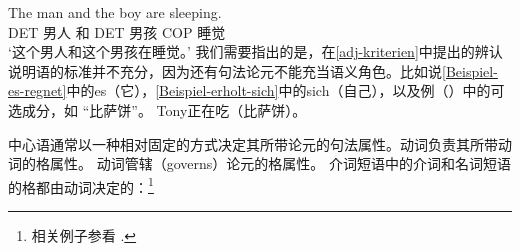 \ea
\gll The man and the boy are sleeping.\\
      DET 男人 和 DET 男孩  COP 睡觉\\
\glt `这个男人和这个男孩在睡觉。' 
\z
我们需要指出的是，在\ref{adj-kriterien}中提出的辨认说明语的标准并不充分，因为还有句法论元不能充当语义角色。比如说\ref{Beispiel-es-regnet}中的es（它），\ref{Beispiel-erholt-sich}中的sich（自己），以及例（）中的可选成分，如 “比萨饼”。
\ea
Tony正在吃（比萨饼）。 
\z

\noindent
中心语通常以一种相对固定的方式决定其所带论元的句法属性。动词负责其所带动词的格属性。
\eal
{}
\zl
动词管辖（governs）论元的格属性。
 介词短语中的介词和名词短语的格都由动词决定的：\footnote{相关例子参看 .
}


